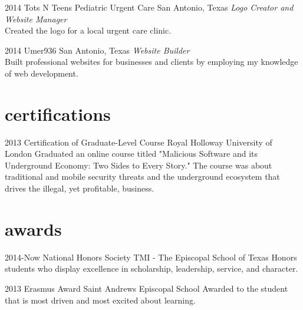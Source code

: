 \documentclass[]{friggeri-cv} %
\begin{document}
\begin{entrylist}

\entry
{2014}
{Tots N Teens Pediatric Urgent Care}
{San Antonio, Texas}
{\emph{Logo Creator and Website Manager} \\
	Created the logo for a local urgent care clinic.}


\entry
{2014}
{Umer936}
{San Antonio, Texas}
{\emph{Website Builder} \\
	Built professional websites for businesses and clients by employing my knowledge of web development.}

	
\end{entrylist}


\section{certifications}

\begin{entrylist}


\entry
{2013}
{Certification of Graduate-Level Course}
{Royal Holloway University of London}
{Graduated an online course titled "Malicious Software and its Underground Economy: Two Sides to Every Story." The course was about traditional and mobile security threats and the underground ecosystem that drives the illegal, yet profitable, business.}


\end{entrylist} 

\section{awards}

\begin{entrylist}


\entry
{2014-Now}
{National Honors Society}
{TMI - The Episcopal School of Texas}
{Honors students who display excellence in scholarship, leadership, service, and character.}


\entry
{2013}
{Erasmus Award}
{Saint Andrews Episcopal School}
{Awarded to the student that is most driven and most excited about learning.}


\end{entrylist}
\end{document}

